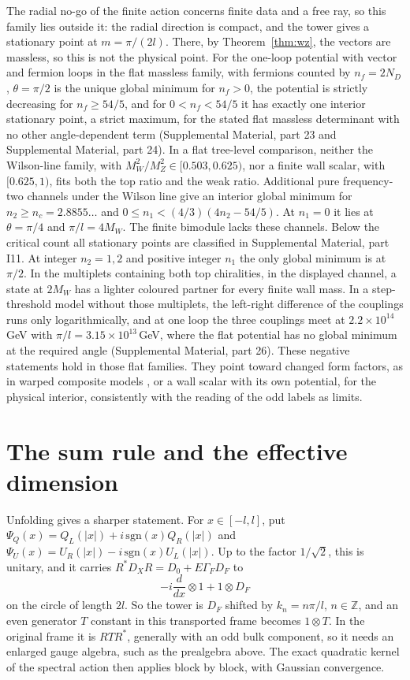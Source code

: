 \documentclass[aps,prd,reprint,onecolumn,nofootinbib,amsmath,amssymb,floatfix]{revtex4-2}
\theoremstyle{plain}
\newcommand{\supp}[1]{Supplemental Material, part #1}
\begin{document}
The radial no-go of the finite action \cite{towerlesspaper} concerns finite data and a free ray, so this family lies outside it: the radial direction is compact, and the tower gives a stationary point at $m=\pi/(2l)$. There, by Theorem~\ref{thm:wz}, the vectors are massless, so this is not the physical point. For the one-loop potential with vector and fermion loops in the flat massless family, with fermions counted by $n_f=2N_D$, $\theta=\pi/2$ is the unique global minimum for $n_f>0$, the potential is strictly decreasing for $n_f\ge54/5$, and for $0<n_f<54/5$ it has exactly one interior stationary point, a strict maximum, for the stated flat massless determinant with no other angle-dependent term (\supp{23} and \supp{24}). In a flat tree-level comparison, neither the Wilson-line family, with $M_W^2/M_Z^2\in[0.503,0.625)$, nor a finite wall scalar, with $[0.625,1)$, fits both the top ratio and the weak ratio. Additional pure frequency-two channels under the Wilson line give an interior global minimum for $n_2\ge n_c=2.8855\ldots$ and $0\le n_1<(4/3)(4n_2-54/5)$. At $n_1=0$ it lies at $\theta=\pi/4$ and $\pi/l=4M_W$. The finite bimodule lacks these channels. Below the critical count all stationary points are classified in \supp{I11}. At integer $n_2=1,2$ and positive integer $n_1$ the only global minimum is at $\pi/2$. In the multiplets containing both top chiralities, in the displayed channel, a state at $2M_W$ has a lighter coloured partner for every finite wall mass. In a step-threshold model without those multiplets, the left-right difference of the couplings runs only logarithmically, and at one loop the three couplings meet at $2.2\times10^{14}$\,GeV with $\pi/l=3.15\times10^{13}$\,GeV, where the flat potential has no global minimum at the required angle (\supp{26}). These negative statements hold in those flat families. They point toward changed form factors, as in warped composite models \cite{ACP2005}, or a wall scalar with its own potential, for the physical interior, consistently with the reading of the odd labels as limits.

\section{The sum rule and the effective dimension}

Unfolding gives a sharper statement. For $x\in[-l,l]$, put $\Psi_Q(x)=Q_L(|x|)+i\,\mathrm{sgn}(x)Q_R(|x|)$ and $\Psi_U(x)=U_R(|x|)-i\,\mathrm{sgn}(x)U_L(|x|)$. Up to the factor $1/\sqrt2$, this is unitary, and it carries $R^*D_XR=D_0+E\Gamma_FD_F$ to
\begin{equation}
-i\frac{d}{dx}\otimes1+1\otimes D_F
\end{equation}
on the circle of length $2l$. So the tower is $D_F$ shifted by $k_n=n\pi/l$, $n\in\mathbb Z$, and an even generator $T$ constant in this transported frame becomes $1\otimes T$. In the original frame it is $RTR^*$, generally with an odd bulk component, so it needs an enlarged gauge algebra, such as the prealgebra above. The exact quadratic kernel of the spectral action \cite{towerlesspaper} then applies block by block, with Gaussian convergence.
\end{document}
